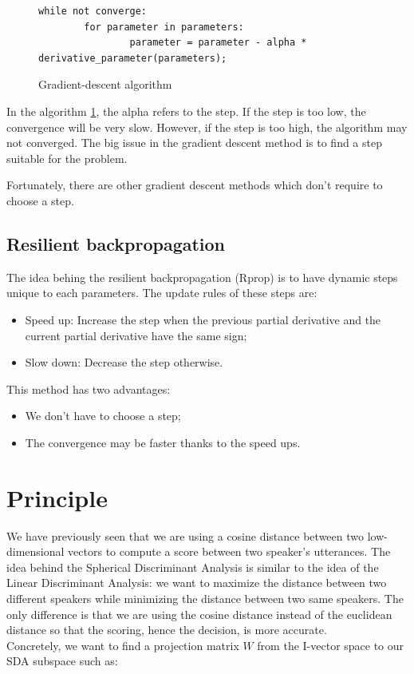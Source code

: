 \documentclass{techrep} %
\begin{document}
\begin{figure}[H]
  \begin{lstlisting}[frame=single]
    while not converge:
        for parameter in parameters:
                parameter = parameter - alpha * derivative_parameter(parameters);
  \end{lstlisting}
  \caption{Gradient-descent algorithm}
  \label{algo_gradient_descent}
\end{figure}

In the algorithm \ref{algo_gradient_descent}, the alpha refers to the
step. If the step is too low, the convergence will be very
slow. However, if the step is too high, the algorithm may not
converged. The big issue in the gradient descent method is to find a
step suitable for the problem.

Fortunately, there are other gradient descent methods which don't
require to choose a step.

\subsection{Resilient backpropagation}

The idea behing the resilient backpropagation (Rprop) is to have
dynamic steps unique to each parameters.
The update rules of these steps are:
\begin{itemize}
\item Speed up: Increase the step when the previous partial derivative and the
  current partial derivative have the same sign;
\item Slow down: Decrease the step otherwise.
\end{itemize}

This method has two advantages:
\begin{itemize}
\item We don't have to choose a step;
\item The convergence may be faster thanks to the speed ups.
\end{itemize}
\section{Principle}

We have previously seen that we are using a cosine distance between
two low-dimensional vectors to compute a score between two speaker's
utterances. The idea behind the Spherical Discriminant Analysis is
similar to the idea of the Linear Discriminant Analysis: we want to
maximize the distance between two different speakers while minimizing
the distance between two same speakers. The only difference is that we
are using the cosine distance instead of the euclidean distance so
that the scoring, hence the decision, is more accurate.\\ Concretely,
we want to find a projection matrix $W$ from the I-vector space to our
SDA subspace such as:
\end{document}

